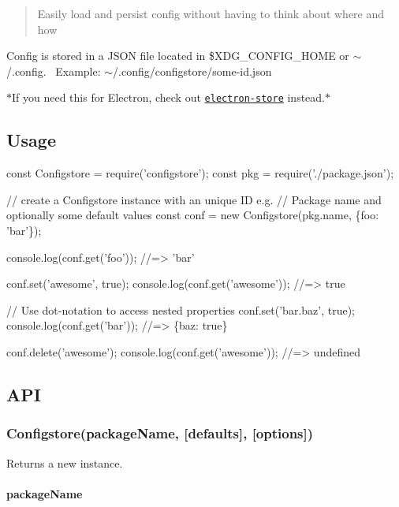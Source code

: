 \begin{quote}
Easily load and persist config without having to think about where and how \end{quote}


Config is stored in a J\+S\+ON file located in {\ttfamily \$\+X\+D\+G\+\_\+\+C\+O\+N\+F\+I\+G\+\_\+\+H\+O\+ME} or {\ttfamily $\sim$/.config}.~\newline
 Example\+: {\ttfamily $\sim$/.config/configstore/some-\/id.\+json}

$\ast$\+If you need this for Electron, check out \href{https://github.com/sindresorhus/electron-store}{\tt {\ttfamily electron-\/store}} instead.$\ast$

\subsection*{Usage}


\begin{DoxyCode}
const Configstore = require('configstore');
const pkg = require('./package.json');

// create a Configstore instance with an unique ID e.g.
// Package name and optionally some default values
const conf = new Configstore(pkg.name, \{foo: 'bar'\});

console.log(conf.get('foo'));
//=> 'bar'

conf.set('awesome', true);
console.log(conf.get('awesome'));
//=> true

// Use dot-notation to access nested properties
conf.set('bar.baz', true);
console.log(conf.get('bar'));
//=> \{baz: true\}

conf.delete('awesome');
console.log(conf.get('awesome'));
//=> undefined
\end{DoxyCode}


\subsection*{A\+PI}

\subsubsection*{Configstore(package\+Name, \mbox{[}defaults\mbox{]}, \mbox{[}options\mbox{]})}

Returns a new instance.

\paragraph*{package\+Name}

